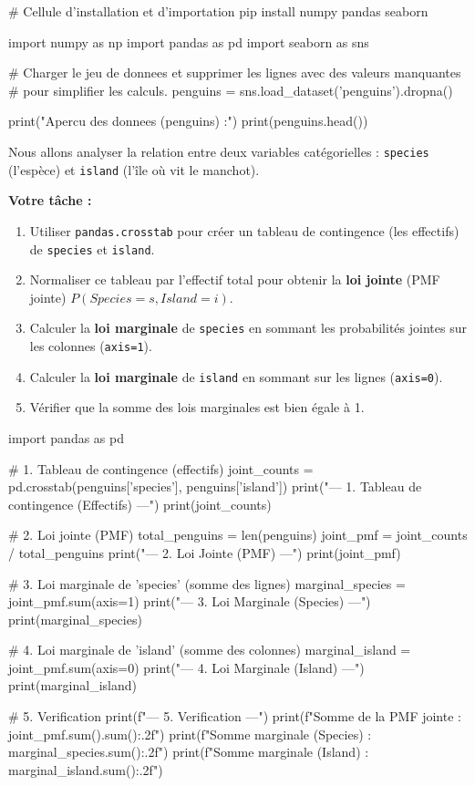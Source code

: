 \begin{codecell}
# Cellule d'installation et d'importation
pip install numpy pandas seaborn
\end{codecell}

\begin{codecell}
import numpy as np
import pandas as pd
import seaborn as sns

# Charger le jeu de donnees et supprimer les lignes avec des valeurs manquantes
# pour simplifier les calculs.
penguins = sns.load_dataset('penguins').dropna()

print("Apercu des donnees (penguins) :")
print(penguins.head())
\end{codecell}

\begin{exercicebox}
Nous allons analyser la relation entre deux variables catégorielles : \texttt{species} (l'espèce) et \texttt{island} (l'île où vit le manchot).

\textbf{Votre tâche :}
\begin{enumerate}
    \item Utiliser \texttt{pandas.crosstab} pour créer un tableau de contingence (les effectifs) de \texttt{species} et \texttt{island}.
    \item Normaliser ce tableau par l'effectif total pour obtenir la \textbf{loi jointe} (PMF jointe) $P(Species=s, Island=i)$.
    \item Calculer la \textbf{loi marginale} de \texttt{species} en sommant les probabilités jointes sur les colonnes (\texttt{axis=1}).
    \item Calculer la \textbf{loi marginale} de \texttt{island} en sommant sur les lignes (\texttt{axis=0}).
    \item Vérifier que la somme des lois marginales est bien égale à 1.
\end{enumerate}

\begin{codecell}
import pandas as pd

# 1. Tableau de contingence (effectifs)
joint_counts = pd.crosstab(penguins['species'], penguins['island'])
print("--- 1. Tableau de contingence (Effectifs) ---")
print(joint_counts)

# 2. Loi jointe (PMF)
total_penguins = len(penguins)
joint_pmf = joint_counts / total_penguins
print("\n--- 2. Loi Jointe (PMF) ---")
print(joint_pmf)

# 3. Loi marginale de 'species' (somme des lignes)
marginal_species = joint_pmf.sum(axis=1)
print("\n--- 3. Loi Marginale (Species) ---")
print(marginal_species)

# 4. Loi marginale de 'island' (somme des colonnes)
marginal_island = joint_pmf.sum(axis=0)
print("\n--- 4. Loi Marginale (Island) ---")
print(marginal_island)

# 5. Verification
print(f"\n--- 5. Verification ---")
print(f"Somme de la PMF jointe : {joint_pmf.sum().sum():.2f}")
print(f"Somme marginale (Species) : {marginal_species.sum():.2f}")
print(f"Somme marginale (Island) : {marginal_island.sum():.2f}")
\end{codecell}
\end{exercicebox}

